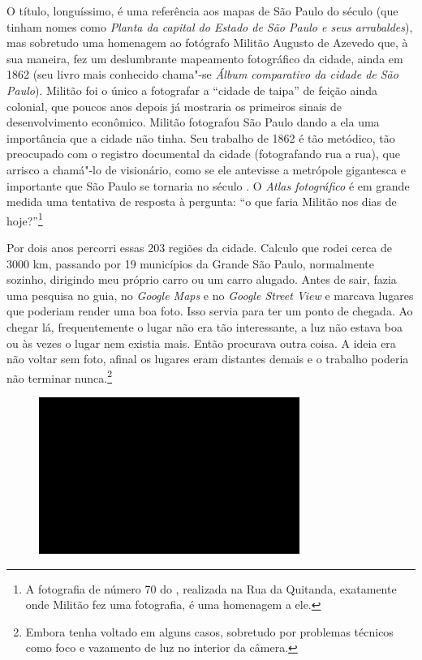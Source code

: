 O título, longuíssimo, é uma referência aos mapas de São Paulo do século
 (que tinham nomes como \emph{Planta da capital do Estado de São
Paulo e seus arrabaldes}), mas sobretudo uma homenagem ao fotógrafo
Militão Augusto de Azevedo que, à sua maneira, fez um deslumbrante
mapeamento fotográfico da cidade, ainda em 1862 (seu livro mais
conhecido chama"-se \emph{Álbum comparativo da cidade de São Paulo}).
Militão foi o único a fotografar a ``cidade de taipa'' de feição ainda
colonial, que poucos anos depois já mostraria os primeiros sinais de
desenvolvimento econômico. Militão fotografou São Paulo dando a ela uma
importância que a cidade não tinha. Seu trabalho de 1862 é tão metódico,
tão preocupado com o registro documental da cidade (fotografando rua a
rua), que arrisco a chamá"-lo de visionário, como se ele antevisse a
metrópole gigantesca e importante que São Paulo se tornaria no século
. O \emph{Atlas fotográfico} é em grande medida uma tentativa de
resposta à pergunta: ``o que faria Militão nos dias de hoje?''\footnote{A
  fotografia de número 70 do {}, realizada na Rua da Quitanda,
  exatamente onde Militão fez uma fotografia, é uma homenagem a ele.}

Por dois anos percorri essas 203 regiões da cidade. Calculo que rodei
cerca de 3000 km, passando por 19 municípios da Grande São Paulo,
normalmente sozinho, dirigindo meu próprio carro ou um carro alugado.
Antes de sair, fazia uma pesquisa no guia, no \emph{Google Maps} e no
\emph{Google Street View} e marcava lugares que poderiam render uma boa
foto. Isso servia para ter um ponto de chegada. Ao chegar lá,
frequentemente o lugar não era tão interessante, a luz não estava boa ou
às vezes o lugar nem existia mais. Então procurava outra coisa. A ideia
era não voltar sem foto, afinal os lugares eram distantes demais e o
trabalho poderia não terminar nunca.\footnote{Embora tenha voltado em
  alguns casos, sobretudo por problemas técnicos como foco e vazamento
  de luz no interior da câmera.}

\begin{figure}[!ht]

\centering
 \includegraphics[width=85mm]{./imgs/im1.jpg}
\caption{\tiny{}}

\end{figure}

